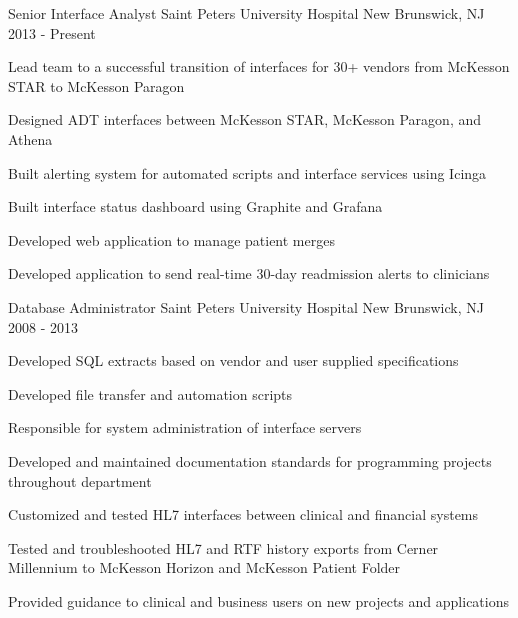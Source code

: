 

\begin{cventries}

  \cventry
  {Senior Interface Analyst} %
  {Saint Peters University Hospital} %
  {New Brunswick, NJ} %
  {2013 - Present} %
  {
    \begin{cvitems} %
      \item {Lead team to a successful transition of interfaces for 30+ vendors from McKesson STAR to McKesson Paragon}
      \item {Designed ADT interfaces between McKesson STAR, McKesson Paragon, and Athena}
      \item {Built alerting system for automated scripts and interface services using Icinga}
      \item {Built interface status dashboard using Graphite and Grafana}
      \item {Developed web application to manage patient merges}
      \item {Developed application to send real-time 30-day readmission alerts to clinicians}
    \end{cvitems}
  }

  \cventry
  {Database Administrator} %
  {Saint Peters University Hospital} %
  {New Brunswick, NJ} %
  {2008 - 2013} %
  {
    \begin{cvitems} %
      \item {Developed SQL extracts based on vendor and user supplied specifications}
      \item {Developed file transfer and automation scripts}
      \item {Responsible for system administration of interface servers}
      \item {Developed and maintained documentation standards for programming projects throughout department}
      \item {Customized and tested HL7 interfaces between clinical and financial systems}
      \item {Tested and troubleshooted HL7 and RTF history exports from Cerner Millennium to McKesson Horizon and McKesson Patient Folder}
      \item {Provided guidance to clinical and business users on new projects and applications}
    \end{cvitems}
  }


\end{cventries}

